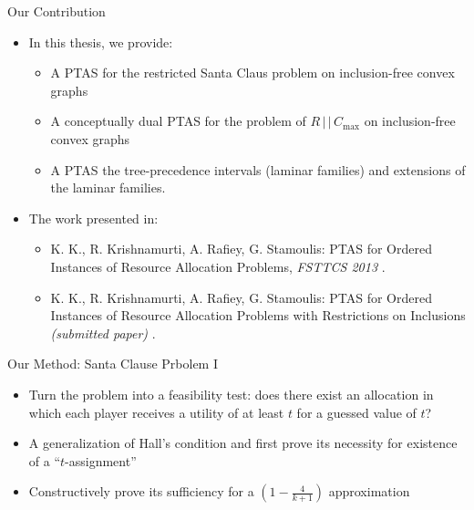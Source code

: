 \documentclass[10pt]{beamer}
\begin{document}
\begin{frame}{Our Contribution}	
    \begin{itemize}
    	\item<1-> In this thesis, we provide:
        \begin{itemize}
	    	\item<2-> A PTAS for the restricted Santa Claus problem on inclusion-free convex graphs
        	\item<3-> A conceptually dual PTAS for the problem of $R \, | \, | \, C_{\max}$ on inclusion-free convex graphs
        	\item<4-> A PTAS the tree-precedence intervals (\alert{laminar families}) and extensions of the laminar families.
    	\end{itemize}
		\item<4-> The work presented in:
    	\begin{itemize}
    		\item<5-> K. K., R. Krishnamurti, A. Rafiey, G. Stamoulis:
\alert{PTAS for Ordered Instances of Resource Allocation Problems}, \emph{FSTTCS 2013} \cite{KKRS13}.
        	\item<6-> K. K., R. Krishnamurti, A. Rafiey, G. Stamoulis:
\alert{PTAS for Ordered Instances of Resource Allocation Problems with Restrictions on Inclusions} \emph{(submitted paper)} \cite{KKRS16}.
		\end{itemize}
    \end{itemize}
\end{frame}

\begin{frame}{Our Method: Santa Clause Prbolem I}
	\begin{itemize}
    	\item<1-> Turn the problem into a feasibility test: does there exist an allocation in which each player receives a utility of at least $t$ for a \alert{guessed} value of $t$?
        \item<2-> A generalization of \alert{Hall's condition} and first prove its necessity for existence of a ``$t$-assignment''
        \item<3-> Constructively prove its sufficiency for a \alert{$(1 - \frac{4}{k + 1})$} approximation
    \end{itemize}
\end{frame}
\end{document}
